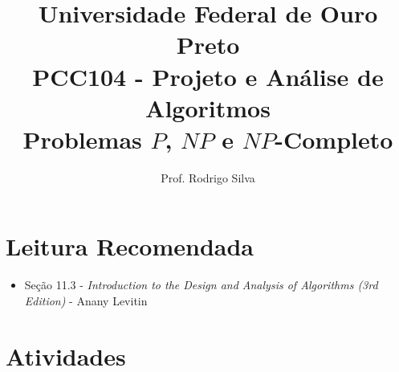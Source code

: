 \documentclass{article}
\title{\vspace{-2 cm}Universidade Federal de Ouro Preto \\ PCC104 - Projeto e Análise de Algoritmos \\ Problemas $P$, $NP$ e $NP$-Completo}
\author{Prof. Rodrigo Silva}
\begin{document}
\maketitle

\section{Leitura Recomendada}

\begin{itemize}
    \item Seção 11.3 - \textit{Introduction to the Design and Analysis of Algorithms (3rd Edition)} - Anany Levitin 
\end{itemize}

\section{Atividades}
\end{document}
